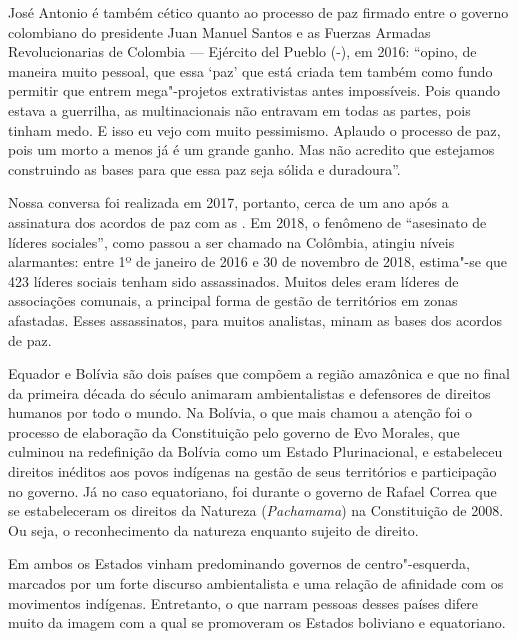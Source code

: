José Antonio é também cético quanto ao processo de paz firmado entre o
governo colombiano do presidente Juan Manuel Santos e as Fuerzas Armadas Revolucionarias de Colombia --- Ejército del Pueblo (-), em 2016:
``opino, de maneira muito pessoal, que essa `paz' que está criada
tem também como fundo permitir que entrem mega"-projetos extrativistas
antes impossíveis. Pois quando estava a guerrilha, as multinacionais não
entravam em todas as partes, pois tinham medo. E isso eu vejo com muito
pessimismo. Aplaudo o processo de paz, pois um morto a menos já é um
grande ganho. Mas não acredito que estejamos construindo as bases para
que essa paz seja sólida e duradoura''.

Nossa conversa foi realizada em 2017, portanto, cerca de um ano após a
assinatura dos acordos de paz com as . Em 2018, o fenômeno de
``asesinato de líderes sociales'', como passou a ser chamado na
Colômbia, atingiu níveis alarmantes: entre 1º de
janeiro de 2016 e 30 de novembro de 2018, estima"-se que 423 líderes
sociais tenham sido assassinados. Muitos deles eram líderes de
associações comunais, a principal forma de gestão de territórios em
zonas afastadas. Esses assassinatos, para muitos analistas, minam as
bases dos acordos de paz.

Equador e Bolívia são dois países que compõem a região amazônica e que
no final da primeira década do século  animaram ambientalistas e
defensores de direitos humanos por todo o mundo. Na Bolívia, o que mais
chamou a atenção foi o processo de elaboração da Constituição pelo
governo de Evo Morales, que culminou na redefinição da Bolívia como um
Estado Plurinacional, e estabeleceu direitos inéditos aos povos
indígenas na gestão de seus territórios e participação no governo. Já no
caso equatoriano, foi durante o governo de Rafael Correa que se
estabeleceram os direitos da Natureza (\emph{Pachamama}) na Constituição
de 2008. Ou seja, o reconhecimento da natureza enquanto
sujeito de direito.

Em ambos os Estados vinham predominando governos de
centro"-esquerda, marcados por um forte discurso ambientalista e uma
relação de afinidade com os movimentos indígenas. Entretanto, o que
narram pessoas desses países difere muito da imagem com a qual se
promoveram os Estados boliviano e equatoriano.

